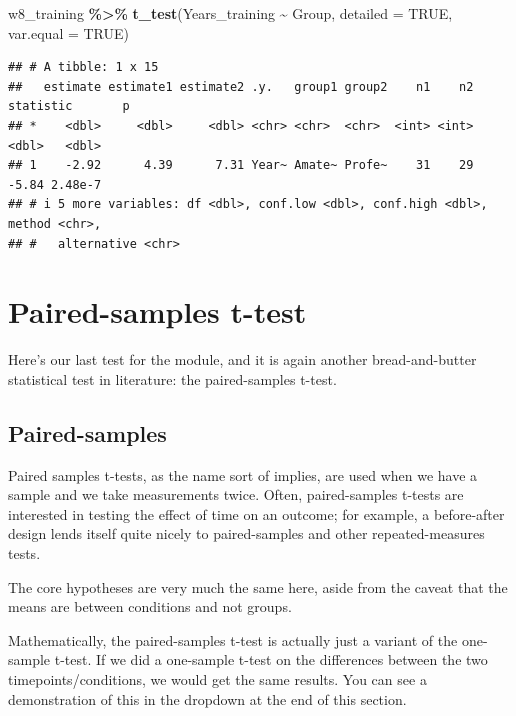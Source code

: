 \documentclass[
]{book}
\newenvironment{Shaded}{\begin{snugshade}}{\end{snugshade}}
\newcommand{\AttributeTok}[1]{\textcolor[rgb]{0.13,0.29,0.53}{#1}}
\newcommand{\ConstantTok}[1]{\textcolor[rgb]{0.56,0.35,0.01}{#1}}
\newcommand{\FunctionTok}[1]{\textcolor[rgb]{0.13,0.29,0.53}{\textbf{#1}}}
\newcommand{\NormalTok}[1]{#1}
\newcommand{\SpecialCharTok}[1]{\textcolor[rgb]{0.81,0.36,0.00}{\textbf{#1}}}
\begin{document}
\begin{Shaded}
\begin{Highlighting}[]
\NormalTok{w8\_training }\SpecialCharTok{\%\textgreater{}\%}
  \FunctionTok{t\_test}\NormalTok{(Years\_training }\SpecialCharTok{\textasciitilde{}}\NormalTok{ Group, }\AttributeTok{detailed =} \ConstantTok{TRUE}\NormalTok{, }\AttributeTok{var.equal =} \ConstantTok{TRUE}\NormalTok{)}
\end{Highlighting}
\end{Shaded}

\begin{verbatim}
## # A tibble: 1 x 15
##   estimate estimate1 estimate2 .y.   group1 group2    n1    n2 statistic       p
## *    <dbl>     <dbl>     <dbl> <chr> <chr>  <chr>  <int> <int>     <dbl>   <dbl>
## 1    -2.92      4.39      7.31 Year~ Amate~ Profe~    31    29     -5.84 2.48e-7
## # i 5 more variables: df <dbl>, conf.low <dbl>, conf.high <dbl>, method <chr>,
## #   alternative <chr>
\end{verbatim}

\section{Paired-samples t-test}\label{paired-samples-t-test}

Here's our last test for the module, and it is again another bread-and-butter statistical test in literature: the paired-samples t-test.

\subsection{Paired-samples}\label{paired-samples}

Paired samples t-tests, as the name sort of implies, are used when we have a sample and we take measurements twice. Often, paired-samples t-tests are interested in testing the effect of time on an outcome; for example, a before-after design lends itself quite nicely to paired-samples and other repeated-measures tests.

The core hypotheses are very much the same here, aside from the caveat that the means are between conditions and not groups.

Mathematically, the paired-samples t-test is actually just a variant of the one-sample t-test. If we did a one-sample t-test on the differences between the two timepoints/conditions, we would get the same results. You can see a demonstration of this in the dropdown at the end of this section.
\end{document}
